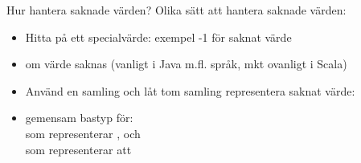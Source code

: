 


\ifkompendium\else

{
\begin{frame}[plain]
    \color{white}{Inkapsling av speciella värden så att krasch kan undvikas}
\end{frame}
}
\fi


\begin{Slide}{Hur hantera saknade värden?}\SlideFontSmall
Olika sätt att hantera saknade värden:
\begin{itemize}
\item Hitta på ett specialvärde: exempel -1 för saknat värde
\item {} om värde saknas (vanligt i Java m.fl. språk, mkt ovanligt i Scala)
\item Använd en samling och låt tom samling representera saknat värde: \\
\pause
\item {} gemensam bastyp för: \\
   som representerar , och \\  som representerar att 
\end{itemize}
\end{Slide}



